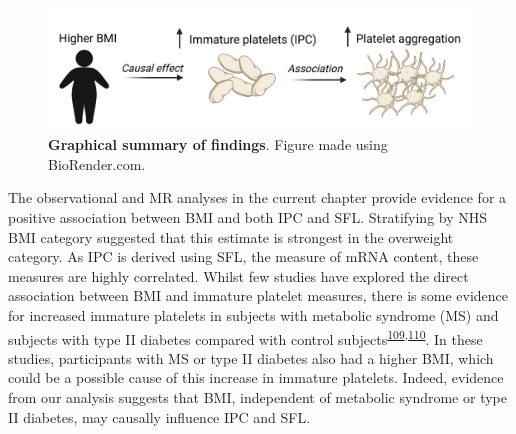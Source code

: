 \documentclass[11pt,twoside]{bristolthesis}
\begin{document}
\begin{figure}
\includegraphics[width=0.9\linewidth]{figure/BMI_platelets/Visual_abstract} \caption[Graphical summary of findings]{\textbf{Graphical summary of findings}. Figure made using BioRender.com.}\label{fig:BMI-platelet-cartoon}
\end{figure}
The observational and MR analyses in the current chapter provide evidence for a positive association between BMI and both IPC and SFL. Stratifying by NHS BMI category suggested that this estimate is strongest in the overweight category. As IPC is derived using SFL, the measure of mRNA content, these measures are highly correlated. Whilst few studies have explored the direct association between BMI and immature platelet measures, there is some evidence for increased immature platelets in subjects with metabolic syndrome (MS) and subjects with type II diabetes compared with control subjects\textsuperscript{\protect\hyperlink{ref-Vaduganathan2008a}{109},\protect\hyperlink{ref-Mijovic2015a}{110}}. In these studies, participants with MS or type II diabetes also had a higher BMI, which could be a possible cause of this increase in immature platelets. Indeed, evidence from our analysis suggests that BMI, independent of metabolic syndrome or type II diabetes, may causally influence IPC and SFL.
\end{document}

